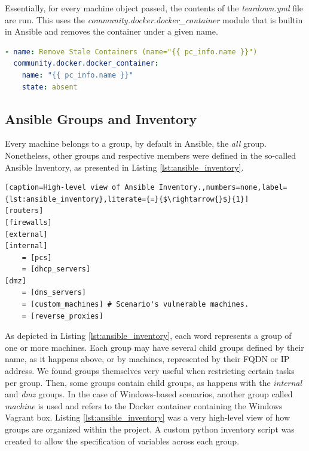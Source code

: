 Essentially, for every machine object passed, the contents of the \textit{teardown.yml} file are run. This uses the \textit{community.docker.docker\_container} module that is builtin in Ansible and removes the container under a given name.

\begin{lstlisting}[language=yaml,caption=File \textit{teardown.yml}.,numbers=none,label={lst:ansible_teardown}]
- name: Remove Stale Containers (name="{{ pc_info.name }}")
  community.docker.docker_container:
    name: "{{ pc_info.name }}"
    state: absent
\end{lstlisting}

\subsection{Ansible Groups and Inventory} \label{sec:ansible_groups_inventory}


Every machine belongs to a group, by default in Ansible, the \textit{all} group. Nonetheless, other groups and respective members were defined in the so-called Ansible Inventory, as presented in Listing \ref{lst:ansible_inventory}.

\begin{lstlisting}[caption=High-level view of Ansible Inventory.,numbers=none,label={lst:ansible_inventory},literate={=}{$\rightarrow{}$}{1}]
[routers]
[firewalls]
[external]
[internal]
    = [pcs]
    = [dhcp_servers]
[dmz]
    = [dns_servers]
    = [custom_machines] # Scenario's vulnerable machines.
    = [reverse_proxies]
\end{lstlisting}

As depicted in Listing \ref{lst:ansible_inventory}, each word represents a group of one or more machines. Each group may have several child groups defined by their name, as it happens above, or by machines, represented by their FQDN or IP address. We found groups themselves very useful when restricting certain tasks per group. Then, some groups contain child groups, as happens with the \textit{internal} and \textit{dmz} groups. In the case of Windows-based scenarios, another group called \textit{machine} is used and refers to the Docker container containing the Windows Vagrant box. Listing \ref{lst:ansible_inventory} was a very high-level view of how groups are organized within the project. A custom python inventory script was created to allow the specification of variables across each group.


